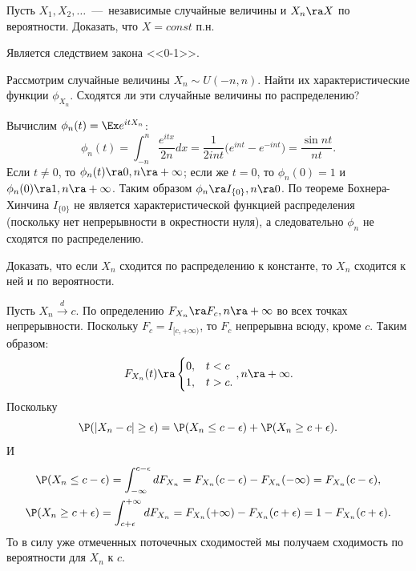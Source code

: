 \begin{problem}
    Пусть $X_1, X_2, \ldots$~---~независимые случайные величины и $X_n \ra X$ по вероятности.
    Доказать, что $X = const$ п.н.
\end{problem}
\begin{solution}
    Является следствием закона <<0-1>>.
\end{solution}
\begin{problem}
    Рассмотрим случайные величины $X_n \sim U(-n, n)$.
    Найти их характеристические функции $\phi_{X_n}$.
    Сходятся ли эти случайные величины по распределению?
\end{problem}
\begin{solution}
    Вычислим $\phi_n(t) = \Ex e^{it X_n}$:
    \[
        \phi_n(t) = \int_{-n}^{n} \dfrac{e^{itx}}{2n}dx = \dfrac{1}{2int}\big(e^{int} - e^{-int}\big) = \dfrac{\sin nt}{nt}.
    \]
    Если $t \neq 0$, то $\phi_n(t) \ra 0, n \ra  +\infty$; если же $t = 0$, то $\phi_n(0) = 1$ и $\phi_n(0) \ra 1, n \ra +\infty$.
    Таким образом $\phi_n \ra I_{\{0\}}, n \ra 0$.
    По теореме Бохнера-Хинчина $I_{\{0\}}$ не является характеристической функцией распределения (поскольку нет непрерывности в окрестности нуля), а следовательно $\phi_n$ не сходятся по распределению.
\end{solution}
\begin{problem}
    Доказать, что если $X_n$ сходится по распределению к константе, то $X_n$ сходится к ней и по вероятности.
\end{problem}
\begin{solution}
    Пусть $X_n \xrightarrow{d} c$.
    По определению $F_{X_n} \ra F_c, n \ra +\infty$ во всех точках непрерывности.
    Поскольку $F_c = I_{[c, +\infty)}$, то $F_c$ непрерывна всюду, кроме $c$.
    Таким образом:
    \[
        F_{X_n}(t) \ra \begin{cases} 0, & t < c \\
                           1, & t > c.
        \end{cases}, n \ra +\infty.
    \]
    Поскольку
    \[
        \P(|X_n - c| \geq \epsilon) = \P(X_n \leq c - \epsilon) + \P(X_n \geq c + \epsilon).
    \]
    И
    \begin{multline*}\P(X_n \leq c - \epsilon) = \int_{-\infty}^{c - \epsilon}dF_{X_n} = F_{X_n}(c - \epsilon) - F_{X_n}(-\infty) = F_{X_n}(c - \epsilon), \\ \P(X_n \geq c + \epsilon) = \int_{c + \epsilon}^{+\infty} dF_{X_n} = F_{X_n}(+\infty) - F_{X_n}(c + \epsilon) = 1 - F_{X_n}(c + \epsilon).
    \end{multline*}
    То в силу уже отмеченных поточечных сходимостей мы получаем сходимость по вероятности для $X_n$ к $c$.
\end{solution}

